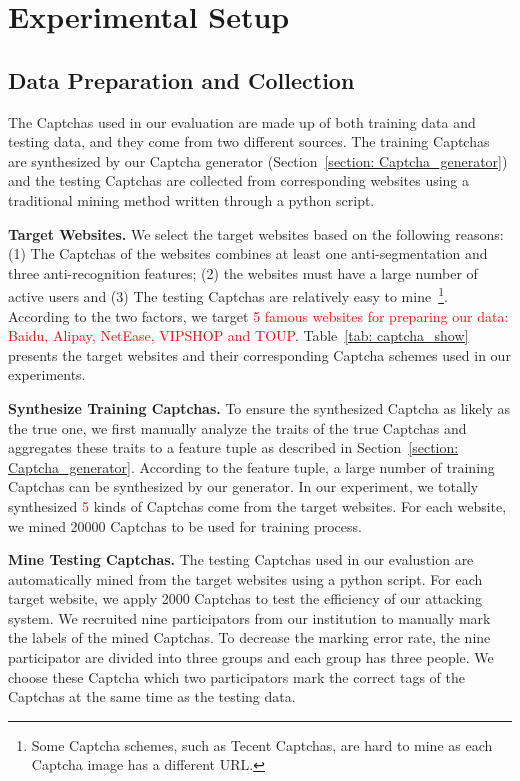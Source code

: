 \section{Experimental Setup}
\subsection{Data Preparation and Collection}
The Captchas used in our evaluation are made up of both training data and testing data, and they come from two different sources. The training Captchas are synthesized by our Captcha generator (Section~\ref{section: Captcha_generator}) and the testing Captchas are collected from corresponding websites using a traditional mining method written through a python script.

\noindent \textbf{Target Websites.} We select the target websites based on the following reasons: (1) The Captchas of the websites combines at least one anti-segmentation and three anti-recognition features; (2) the websites must have a large number of active users and (3) The testing Captchas are relatively easy to mine~\footnote{Some Captcha schemes, such as Tecent Captchas, are hard to mine as each Captcha image has a different URL.}.  According to the two factors, we target \textcolor{red}{5 famous websites for preparing our data: Baidu, Alipay, NetEase, VIPSHOP and TOUP}. Table~\ref{tab: captcha_show} presents the target websites and their corresponding Captcha schemes used in our experiments.

\noindent \textbf{Synthesize Training Captchas.} To ensure the synthesized Captcha as likely as the true one, we first manually analyze the traits of the true Captchas and aggregates these traits to a feature tuple as described in Section~\ref{section: Captcha_generator}. According to the feature tuple, a large number of training Captchas can be synthesized by our generator. In our experiment, we totally synthesized \textcolor{red}{5} kinds of Captchas come from the target websites. For each website, we mined 20000 Captchas to be used for training process.

\noindent \textbf{Mine Testing Captchas.} The testing Captchas used in our evalustion are automatically mined from the target websites using a python script. For each target website, we apply 2000 Captchas to test the efficiency of our attacking system.  We recruited nine participators from our institution to manually mark the labels of the mined Captchas. To decrease the marking error rate, the nine participator are divided into three groups and each group has three people. We choose these Captcha which two participators mark the correct tags of the Captchas at the same time as the testing data.

